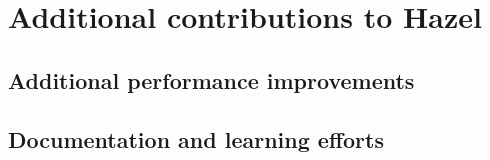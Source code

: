 \section{Additional contributions to Hazel}
\label{app:contributions}

\subsection{Additional performance improvements}
\label{sec:other_perf}


\subsection{Documentation and learning efforts}
\label{sec:study_group}


